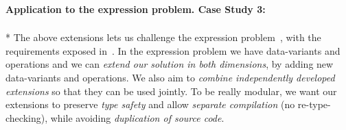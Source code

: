 %
%
% 
%



\paragraph{Application to the expression problem. Case Study 3:}${}_{}$\\*
The above extensions lets us challenge the expression problem~\cite{wadler1998expression},
with the requirements exposed in~\cite{Zenger-Odersky2005}.
In the expression problem we have data-variants and operations and we can
\emph{extend our solution in both dimensions},
by adding new data-variants and operations.
We also aim to \emph{combine independently developed extensions} so
that they can be used jointly.
To be really modular, we want our extensions to
preserve \emph{type safety}
and allow \emph{separate compilation} (no re-type-checking),
while avoiding \emph{duplication of source code}.

